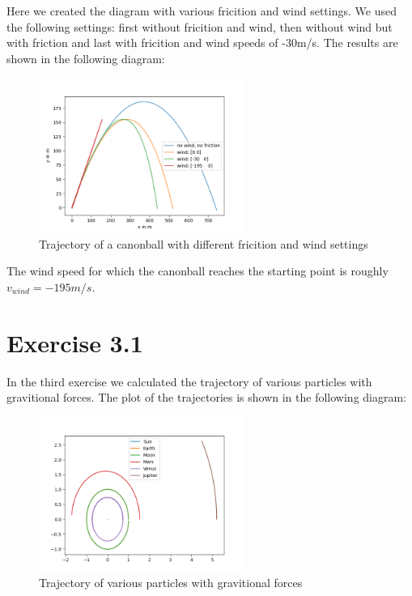\documentclass[a4paper,11pt,bibtotoc]{scrartcl}
\begin{document}
Here we created the diagram with various fricition and wind settings. We used the following settings: first without fricition and wind, then without wind but with friction and last with fricition and wind speeds of -30m/s.
The results are shown in the following diagram:
\begin{figure}[!htbp]
	\centering
	\includegraphics[width=0.6\textwidth]{ex_2_1.png}
	\caption{Trajectory of a canonball with different fricition and wind settings}
	\label{fig:ex_2_2}
\end{figure}

The wind speed for which the canonball reaches the starting point is roughly $v_{wind} = -195m/s$.

\section{Exercise 3.1}

In the third exercise we calculated the trajectory of various particles with gravitional forces.
The plot of the trajectories is shown in the following diagram:
\begin{figure}[!htbp]
	\centering
	\includegraphics[width=0.6\textwidth]{ex_3_1_1.png}
	\caption{Trajectory of various particles with gravitional forces}
	\label{fig:ex_3_1_1}
\end{figure}
\end{document}
